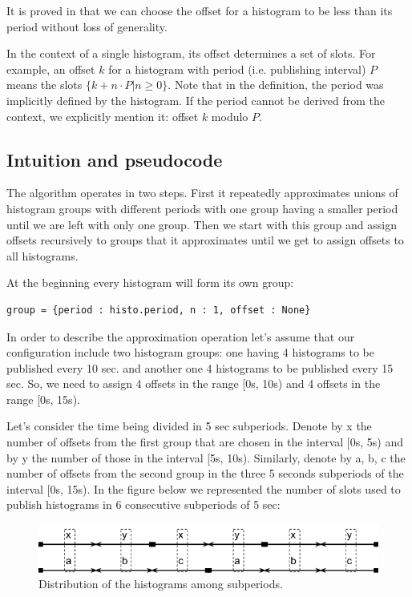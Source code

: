 It is proved in \citep{goossens2003scheduling} that we can choose the offset for a histogram to be less than its period without loss of generality. 

In the context of a single histogram, its offset determines a set of slots. For example, an offset $k$ for a histogram with period (i.e. publishing interval) $P$ means the slots $\{k+n\cdot P | n \geq 0\}$. Note that in the definition, the period was implicitly defined by the histogram. If the period cannot be derived from the context, we explicitly mention it: offset $k$ modulo $P$.

\subsection*{Intuition and pseudocode}

The algorithm operates in two steps. First it repeatedly approximates unions of histogram groups with different periods with one group having a smaller period until we are left with only one group. Then we start with this group and assign offsets recursively to groups that it approximates until we get to assign offsets to all histograms.

At the beginning every histogram will form its own group:
\begin{verbatim}
group = {period : histo.period, n : 1, offset : None}
\end{verbatim}
In order to describe the approximation operation let’s assume that our configuration include two histogram groups: one having 4 histograms to be published every 10 sec. and another one 4 histograms to be published every 15 sec. So, we need to assign 4 offsets in the range [0s, 10s) and 4 offsets in the range [0s, 15s).
 
Let’s consider the time being divided in 5 sec subperiods. Denote by x the number of offsets from the first group that are chosen in the interval [0s, 5s) and by y the number of those in the interval [5s, 10s). Similarly, denote by a, b, c the number of offsets from the second group in the three 5 seconds subperiods of the interval [0s, 15s). In the figure below we represented the number of slots used to publish histograms in 6 consecutive subperiods of 5 sec:

\begin{figure}[ht!]
\centering
\includegraphics[scale=0.6]{Images/subperiod.png}
\caption{Distribution of the histograms among subperiods.}
\end{figure}

